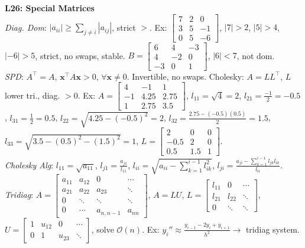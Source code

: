 \documentclass[9pt]{article}
\begin{document}
\begin{multicols}{3}
\textbf{L26: Special Matrices} \\
\textit{Diag. Dom}: $|a_{ii}| \geq \sum_{j \neq i} |a_{ij}|$, strict $>$. Ex: $\begin{bmatrix}7&2&0\\3&5&-1\\0&5&-6\end{bmatrix}$, $|7|>2$, $|5|>4$, $|-6|>5$, strict, no swaps, stable. $B=\begin{bmatrix}6&4&-3\\4&-2&0\\-3&0&1\end{bmatrix}$, $|6|<7$, not dom. \\
\textit{SPD}: $A^\top=A$, $\mathbf{x}^\top A\mathbf{x}>0$, $\forall \mathbf{x} \neq 0$. Invertible, no swaps. Cholesky: $A=LL^\top$, $L$ lower tri., diag. $>0$. Ex: $A=\begin{bmatrix}4&-1&1\\-1&4.25&2.75\\1&2.75&3.5\end{bmatrix}$, $l_{11}=\sqrt{4}=2$, $l_{21}=\frac{-1}{2}=-0.5$, $l_{31}=\frac{1}{2}=0.5$, $l_{22}=\sqrt{4.25-(-0.5)^2}=2$, $l_{32}=\frac{2.75-(-0.5)(0.5)}{2}=1.5$, $l_{33}=\sqrt{3.5-(0.5)^2-(1.5)^2}=1$, $L=\begin{bmatrix}2&0&0\\-0.5&2&0\\0.5&1.5&1\end{bmatrix}$. \\
\textit{Cholesky Alg}: $l_{11}=\sqrt{a_{11}}$, $l_{j1}=\frac{a_{j1}}{l_{11}}$, $l_{ii}=\sqrt{a_{ii}-\sum_{k=1}^{i-1} l_{ik}^2}$, $l_{ji}=\frac{a_{ji}-\sum_{k=1}^{i-1} l_{jk}l_{ik}}{l_{ii}}$. \\
\textit{Tridiag}: $A=\begin{bmatrix}a_{11}&a_{12}&0&\cdots\\a_{21}&a_{22}&a_{23}&\ddots\\0&\ddots&\ddots&\ddots\\0&\cdots&a_{n,n-1}&a_{nn}\end{bmatrix}$, $A=LU$, $L=\begin{bmatrix}l_{11}&0&\cdots\\l_{21}&l_{22}&\ddots\\0&\ddots&\ddots\end{bmatrix}$, $U=\begin{bmatrix}1&u_{12}&0&\cdots\\0&1&u_{23}&\ddots\end{bmatrix}$, solve $\mathcal{O}(n)$. Ex: $y_i'' \approx \frac{y_{i-1}-2y_i+y_{i+1}}{h^2} \to$ tridiag system.


\end{multicols}
\end{document}
